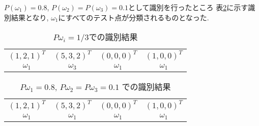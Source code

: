 $P(\omega_1)=0.8$, $P(\omega_2)=P(\omega_3)=0.1$として識別を行ったところ
表\ref{tbl:prob-discrimination-2}に示す識別結果となり,
$\omega_1$にすべてのテスト点が分類されるものとなった.

\begin{table}[htbp]
  \begin{center}
    \begin{tabular}{cccc}
      $(1, 2, 1)^T$ & $(5, 3, 2)^T$ & $(0, 0, 0)^T$ & $(1, 0, 0)^T$ \\
      $\omega_1$ & $\omega_3$ & $\omega_1$ & $\omega_1$
    \end{tabular}
    \caption{$P{\omega_i}=1/3$での識別結果}
    \label{tbl:prob-discrimination-1}
  \end{center}
\end{table}

\begin{table}[htbp]
  \begin{center}
    \begin{tabular}{cccc}
      $(1, 2, 1)^T$ & $(5, 3, 2)^T$ & $(0, 0, 0)^T$ & $(1, 0, 0)^T$ \\
      $\omega_1$ & $\omega_1$ & $\omega_1$ & $\omega_1$
    \end{tabular}
    \caption{$P{\omega_1}=0.8$, $P{\omega_2}=P{\omega_3}=0.1$ での識別結果}
    \label{tbl:prob-discrimination-2}
  \end{center}
\end{table}

